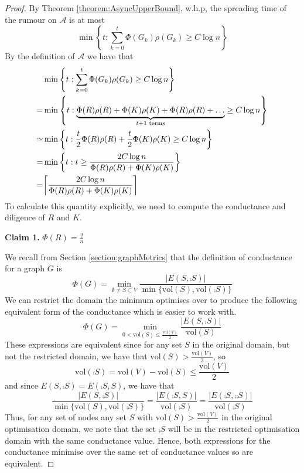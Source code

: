 \begin{proof}
By Theorem \ref{theorem:AsyncUpperBound}, w.h.p, the spreading time of the rumour on $\mathcal{A}$ is at most
$$
	\min \left\{t : \sum_{k=0}^t \Phi(G_k)\rho(G_k) \geq C \log n \right\} 
$$
By the definition of $\mathcal{A}$ we have that 
\begin{align*}
	&\min \left\{t : \sum_{k=0}^t \Phi(G_k)\rho(G_k) \geq C \log n \right\} \\
	= &\min \left\{t : \underbrace{\Phi(R)\rho(R) + \Phi(K)\rho(K) + \Phi(R)\rho(R) + \dots}_{t + 1 \text{ terms}} \geq C \log n \right\} \\
	\simeq &\min \left\{t : \frac{t}{2}\Phi(R)\rho(R) + \frac{t}{2}\Phi(K)\rho(K) \geq C \log n \right\} \\
	= &\min \left\{t : t \geq \frac{2C \log n}{\Phi(R)\rho(R) + \Phi(K)\rho(K)} \right\} \\
	= &\ceil*{\frac{2C \log n}{\Phi(R)\rho(R) + \Phi(K)\rho(K)}}
\end{align*}
To calculate this quantity explicitly, we need to compute the conductance and diligence of $R$ and $K$. 

\textbf{Claim 1.} $\Phi(R)=\frac{2}{n}$

We recall from Section \ref{section:graphMetrics} that the definition of conductance for a graph $G$ is 
$$
	\Phi(G) 
	= \min_{\emptyset \neq S \subset V} \frac{|E(S, \comp{S})|}{\min\{\text{vol}(S), \text{vol}(\comp{S})\}} 
$$
We can restrict the domain the minimum optimises over to produce the following equivalent form of the conductance which is easier to work with.
$$
	\Phi(G) 
	= \min_{0 < \text{vol}(S) \leq \frac{\text{vol}(V)}{2}} \frac{|E(S, \comp{S})|}{\text{vol}(S)} 
$$
These expressions are equivalent since for any set $S$ in the original domain, but not the restricted domain, we have that $\text{vol}(S) > \frac{\text{vol}(V)}{2}$, so
$$
	\text{vol}(\comp{S}) 
	= \text{vol}(V) - \text{vol}(S) 
	\leq \frac{\text{vol}(V)}{2}
$$
and since $E(S, \comp{S}) = E(\comp{S}, S)$, we have that
$$
	\frac{|E(S, \comp{S})|}{\min\{\text{vol}(S), \text{vol}(\comp{S})\}} = \frac{|E(\comp{S}, S)|}{\text{vol}(\comp{S})} 
	= 
	\frac{|E(\comp{S}, \comp{\comp{S}})|}{\text{vol}(\comp{S})} 
$$
Thus, for any set of nodes any set $S$ with $\text{vol}(S) > \frac{\text{vol}(V)}{2}$ in the original optimisation domain, we note that the set $\comp{S}$ will be in the restricted optimisation  domain with the same conductance value. Hence, both expressions for the conductance minimise over the same set of conductance values so are equivalent.


\end{proof}
